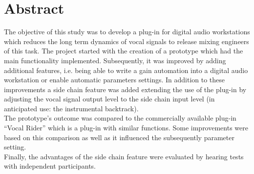 \chapter*{Abstract}

The objective of this study was to develop a plug-in for digital audio workstations which reduces the long term dynamics of vocal signals to release mixing engineers of this task. The project started with the creation of a prototype which had the main functionality implemented. Subsequently, it was improved by adding additional features, i.e. being able to write a gain automation into a digital audio workstation or enable automatic parameters settings. In addition to these improvements a side chain feature was added extending the use of the plug-in by adjusting the vocal signal output level to the side chain input level (in anticipated use: the instrumental backtrack).\\
The prototype's outcome was compared to the commercially available plug-in “Vocal Rider”\cite{VR} which is a plug-in with similar functions. Some improvements were based on this comparison as well as it influenced the subsequently parameter setting.\\
Finally, the advantages of the side chain feature were evaluated by hearing tests with independent participants.\\